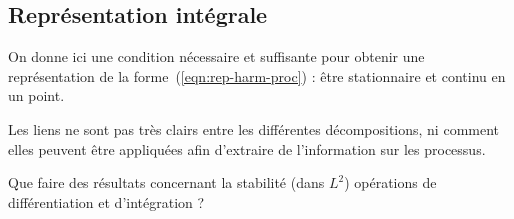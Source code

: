 \subsection{Représentation intégrale}
On donne ici une condition nécessaire et suffisante pour obtenir une
représentation de la forme~(\ref{eqn:rep-harm-proc}) : être
stationnaire et continu en un point.

\begin{alert}
  Les liens ne sont pas très clairs entre les différentes
  décompositions, ni comment elles peuvent être appliquées afin
  d'extraire de l'information sur les processus.
\end{alert}

\begin{question}
  Que faire des résultats concernant la stabilité (dans $L^2$)
  opérations de différentiation et d'intégration ?
\end{question}
